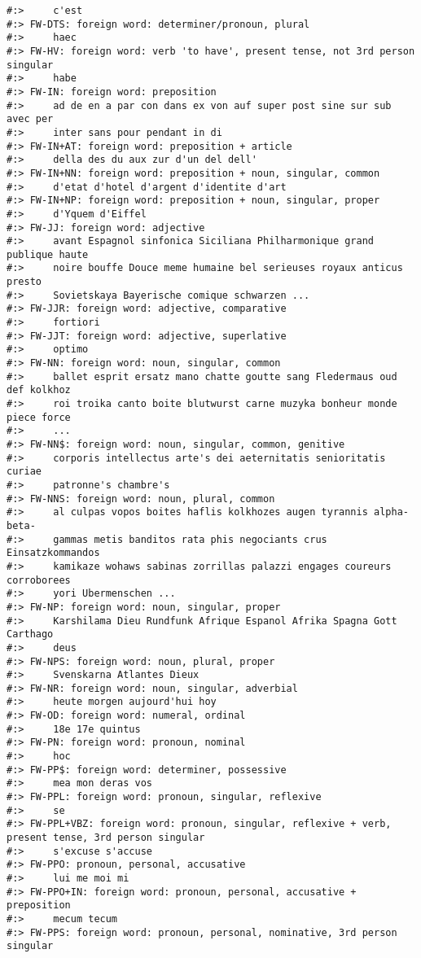 \documentclass[
]{book}
\begin{document}
\begin{verbatim}
#:>     c'est
#:> FW-DTS: foreign word: determiner/pronoun, plural
#:>     haec
#:> FW-HV: foreign word: verb 'to have', present tense, not 3rd person singular
#:>     habe
#:> FW-IN: foreign word: preposition
#:>     ad de en a par con dans ex von auf super post sine sur sub avec per
#:>     inter sans pour pendant in di
#:> FW-IN+AT: foreign word: preposition + article
#:>     della des du aux zur d'un del dell'
#:> FW-IN+NN: foreign word: preposition + noun, singular, common
#:>     d'etat d'hotel d'argent d'identite d'art
#:> FW-IN+NP: foreign word: preposition + noun, singular, proper
#:>     d'Yquem d'Eiffel
#:> FW-JJ: foreign word: adjective
#:>     avant Espagnol sinfonica Siciliana Philharmonique grand publique haute
#:>     noire bouffe Douce meme humaine bel serieuses royaux anticus presto
#:>     Sovietskaya Bayerische comique schwarzen ...
#:> FW-JJR: foreign word: adjective, comparative
#:>     fortiori
#:> FW-JJT: foreign word: adjective, superlative
#:>     optimo
#:> FW-NN: foreign word: noun, singular, common
#:>     ballet esprit ersatz mano chatte goutte sang Fledermaus oud def kolkhoz
#:>     roi troika canto boite blutwurst carne muzyka bonheur monde piece force
#:>     ...
#:> FW-NN$: foreign word: noun, singular, common, genitive
#:>     corporis intellectus arte's dei aeternitatis senioritatis curiae
#:>     patronne's chambre's
#:> FW-NNS: foreign word: noun, plural, common
#:>     al culpas vopos boites haflis kolkhozes augen tyrannis alpha-beta-
#:>     gammas metis banditos rata phis negociants crus Einsatzkommandos
#:>     kamikaze wohaws sabinas zorrillas palazzi engages coureurs corroborees
#:>     yori Ubermenschen ...
#:> FW-NP: foreign word: noun, singular, proper
#:>     Karshilama Dieu Rundfunk Afrique Espanol Afrika Spagna Gott Carthago
#:>     deus
#:> FW-NPS: foreign word: noun, plural, proper
#:>     Svenskarna Atlantes Dieux
#:> FW-NR: foreign word: noun, singular, adverbial
#:>     heute morgen aujourd'hui hoy
#:> FW-OD: foreign word: numeral, ordinal
#:>     18e 17e quintus
#:> FW-PN: foreign word: pronoun, nominal
#:>     hoc
#:> FW-PP$: foreign word: determiner, possessive
#:>     mea mon deras vos
#:> FW-PPL: foreign word: pronoun, singular, reflexive
#:>     se
#:> FW-PPL+VBZ: foreign word: pronoun, singular, reflexive + verb, present tense, 3rd person singular
#:>     s'excuse s'accuse
#:> FW-PPO: pronoun, personal, accusative
#:>     lui me moi mi
#:> FW-PPO+IN: foreign word: pronoun, personal, accusative + preposition
#:>     mecum tecum
#:> FW-PPS: foreign word: pronoun, personal, nominative, 3rd person singular

\end{verbatim}
\end{document}
